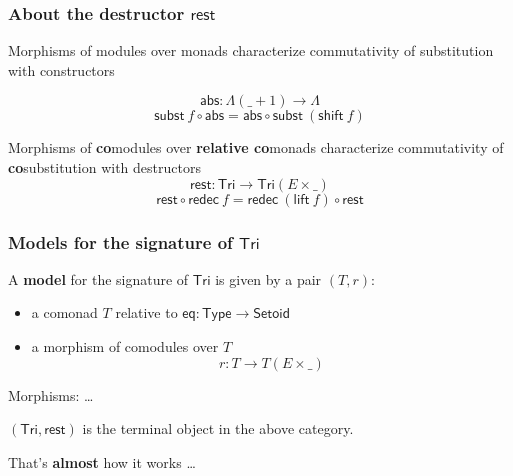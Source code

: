 \documentclass[
]
{beamer}
\newcommand{\constfont}[1]{\ensuremath{\mathsf{#1}}}
\newcommand{\bind}[2]{{#1}\mathbin{\gg\hspace{-.8ex}=}{#2}}
\newcommand{\Tri}{\constfont{Tri}}
\newcommand{\tail}{\constfont{rest}}
\newcommand{\redec}{\constfont{redec}}
\newcommand{\comp}[2]{\ensuremath{{#2} \circ {#1}}}
\newcommand{\shift}{\constfont{shift}}
\newcommand{\lift}{\constfont{lift}}
\newcommand{\subst}{\constfont{subst}}
\newcommand{\Setoid}{\constfont{Setoid}}
\newcommand{\eq}{\ensuremath{\mathsf{eq}}}
\newcommand{\App}{\constfont{app}}
\newcommand{\Abs}{\constfont{abs}}
\newcommand{\LC}{{\Lambda}}
\newcommand{\Set}{\constfont{Type}}
\newcommand{\fat}[1]{\textbf{#1}}
\begin{document}
\begin{frame}
 \frametitle{About the destructor $\tail$}
 \begin{block}{Morphisms of modules over monads}
   characterize commutativity of substitution with constructors

         \[ \Abs : \LC(\_ + 1) \to \LC \]
         \[ \comp{\Abs}{\subst~f} = \comp{\subst~(\shift~f)}{\Abs} \]
 \end{block}

 \begin{block}{Morphisms of \fat{co}modules over \fat{relative co}monads}
   characterize commutativity of \fat{co}substitution with destructors
         \[\tail : \Tri \to \Tri(E\times \_)\]
         \[\comp{\redec~f}{\tail} = \comp{\tail}{\redec~(\lift~f)} \]
 \end{block} 
\end{frame}

\begin{frame}
 \frametitle{Models for the signature of $\Tri$}
  \begin{definition}
    A \fat{model} for the signature of $\Tri$ is given by a pair $(T,r)$:
    \begin{itemize}
     \item a comonad $T$ relative to $\eq: \Set \to \Setoid$
     \item a morphism of comodules over $T$
        \[  r : T \to T(E \times \_) \]
    \end{itemize}
   Morphisms: \ldots
  \end{definition}

 \begin{lemma}[tentative]
  $(\Tri,\tail)$ is the terminal object in the above category.
 \end{lemma}

 That's \fat{almost} how it works \ldots
  
\end{frame}
\end{document}
